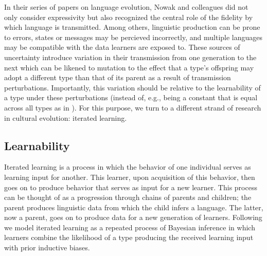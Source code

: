 \documentclass[a4paper]{article}
\begin{document}
In their series of papers on language evolution, Nowak and colleagues did not only consider expressivity but also recognized the central role of the fidelity by which language is transmitted. Among others, linguistic production can be prone to errors, states or messages may be percieved incorrectly, and multiple languages may be compatible with the data learners are exposed to. These sources of uncertainty introduce variation in their transmission from one generation to the next which can be likened to mutation to the effect that a type's offspring may adopt a different type than that of its parent as a result of transmission perturbations. Importantly, this variation should be relative to the learnability of a type under these perturbations (instead of, e.g., being a constant that is equal across all types as in \citealt{nowak+etal:2002}). For this purpose, we turn to a different strand of research in cultural evolution: iterated learning. 


\subsection{Learnability}\label{sec:learnability}
Iterated learning is a process in which the behavior of one individual serves as learning input for another. This learner, upon acquisition of this behavior, then goes on to produce behavior that serves as input for a new learner. This process can be thought of as a progression through chains of parents and children; the parent produces linguistic data from which the child infers a language. The latter, now a parent, goes on to produce data for a new generation of learners. Following \citet{griffiths+kalish:2007} we model iterated learning as a repeated process of Bayesian inference in which learners combine the likelihood of a type producing the received learning input with prior inductive biases. 
\end{document}
